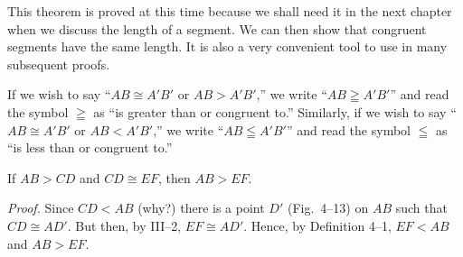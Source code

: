 \documentclass[11pt]{book}
\theoremstyle{bkplain}
\theoremstyle{XIplainnote}
\theoremstyle{bkplain}
\theoremstyle{bkplain}
\begin{document}
\medskip
This theorem is proved at this time because we shall need it in the next chapter
when we discuss the length of a segment. We can then show that congruent segments
have the same length. It is also a very convenient tool to use in many subsequent
proofs.

\FIGIVTWELVETHIRTEEN

\begin{definition}
If we wish to say ``$AB \cong A'B'$ or $AB > A'B'$,'' we write
``$AB \geqq A'B'$'' and read the symbol $\geqq$ as ``is greater than or
congruent to.'' Similarly, if we wish to say ``$AB \cong A'B'$ or
$AB < A'B'$,'' we write ``$AB \leqq A'B'$'' and read the symbol $\leqq$ as ``is
less than or congruent to.''
\end{definition}

\begin{theorem}
If $AB > CD$ and $CD \cong EF$, then $AB > EF$.
\end{theorem}

\noindent\emph{Proof.} Since $CD < AB$ (why?) there is a point $D'$
(Fig.~4--13) on $AB$ such that $CD \cong AD'$. But then, by III--2,
$EF \cong AD'$. Hence, by Definition 4--1, $EF < AB$ and $AB > EF$.

\end{document}
